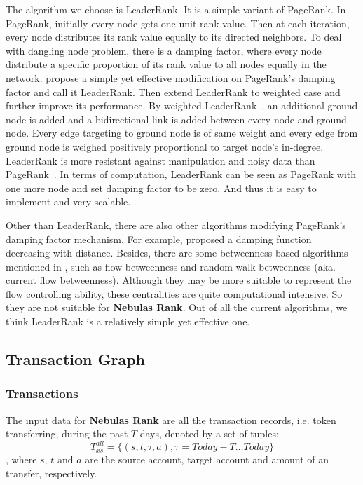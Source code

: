 The algorithm we choose is LeaderRank\cite{Chen2013}\cite{Li2014}. It is a simple variant of PageRank\cite{Brin2010}\cite{page1999pagerank}. In PageRank, initially every node gets one unit rank value. Then at each iteration, every node distributes its rank value equally to its directed neighbors. To deal with dangling node problem, there is a damping factor, where every node distribute a specific proportion of its rank value to all nodes equally in the network. \textcite{Chen2013} propose a simple yet effective modification on PageRank's damping factor and call it LeaderRank. Then \textcite{Li2014} extend LeaderRank to weighted case and further improve its performance. By weighted LeaderRank~\cite{Li2014}, an additional ground node is added and a bidirectional link is added between every node and ground node. Every edge targeting to ground node is of same weight and every edge from ground node is weighed positively proportional to target node's in-degree. LeaderRank is more resistant against manipulation and noisy data than PageRank~\cite{Chen2013}\cite{Li2014}\cite{Lu2016}. In terms of computation, LeaderRank can be seen as PageRank with one more node and set damping factor to be zero. And thus it is easy to implement and very scalable. 

Other than LeaderRank, there are also other algorithms modifying PageRank's damping factor mechanism. For example, \textcite{Baeza-Yates2006} proposed a damping function decreasing with distance. Besides, there are some betweenness based algorithms mentioned in \cite{Borgatti2005}, such as flow betweenness\cite{freeman1991centrality} and random walk betweenness (aka. current flow betweenness)\cite{newman2005measure}. Although they may be more suitable to represent the flow controlling ability, these centralities are quite computational intensive. So they are not suitable for \textbf{Nebulas Rank}. Out of all the current algorithms, we think LeaderRank is a relatively simple yet effective one.

\subsection{Transaction Graph} \label{sec:txg}

\subsubsection{Transactions}\label{subsec:transfer}
The input data for \textbf{Nebulas Rank} are all the transaction records, i.e. token transferring, during the past $T$ days, denoted by a set of tuples:
$$
	T_{xs}^{all} = \{(s,t,\tau, a), \tau = Today-T \dots Today \}
$$
, where $s$, $t$ and $a$ are the source account, target account and amount of an transfer, respectively.

